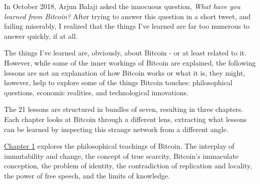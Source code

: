 

In October 2018, Arjun Balaji asked the innocuous question,
\textit{What have you learned from Bitcoin?} After trying to answer this
question in a short tweet, and failing miserably, I realized that the things
I've learned are far too numerous to answer quickly, if at all.

The things I've learned are, obviously, about Bitcoin - or at least related to
it. However, while some of the inner workings of Bitcoin are explained, the
following lessons are not an explanation of how Bitcoin works or what it is,
they might, however, help to explore some of the things Bitcoin touches:
philosophical questions, economic realities, and technological innovations.

The 21 lessons are structured in bundles of seven, resulting in three chapters.
Each chapter looks at Bitcoin through a different lens, extracting what
lessons can be learned by inspecting this strange network from a different
angle.

\hyperref[ch:philosophy]{Chapter 1} explores the philosophical teachings of
Bitcoin. The interplay of immutability and change, the concept of true scarcity,
Bitcoin's immaculate conception, the problem of identity, the contradiction of
replication and locality, the power of free speech, and the limits of knowledge.

%


